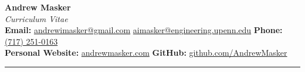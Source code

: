 \begin{center}
    {\LARGE \textbf{Andrew Masker}}\\[2pt]
    \textit{Curriculum Vitae}\\[6pt]
    \textbf{Email:} \href{mailto:andrewimasker@gmail.com}{andrewimasker@gmail.com} \quad\textbar\quad
    \href{mailto:aimasker@engineering.upenn.edu}{aimasker@engineering.upenn.edu} \quad\textbar\quad
    \textbf{Phone:} \href{tel:+17172510163}{(717) 251-0163}\\[2pt]
    \textbf{Personal Website:} \href{https://andrewmasker.com}{andrewmasker.com} \quad\textbar\quad
    \textbf{GitHub:} \href{https://github.com/AndrewMasker}{github.com/AndrewMasker}
\end{center}
\vspace{-6pt}
\hrule
